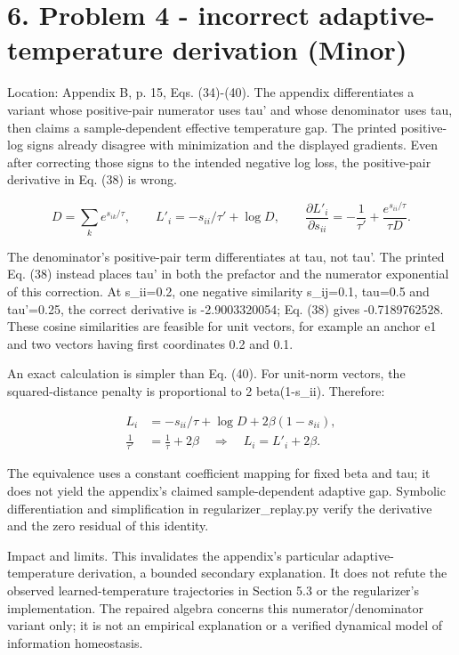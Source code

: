 \documentclass[10pt]{article}
\begin{document}
\section*{6. Problem 4 - incorrect adaptive-temperature derivation (Minor)}
Location: Appendix B, p. 15, Eqs. (34)-(40). The appendix differentiates a variant whose positive-pair numerator uses tau’ and whose denominator uses tau, then claims a sample-dependent effective temperature gap. The printed positive-log signs already disagree with minimization and the displayed gradients. Even after correcting those signs to the intended negative log loss, the positive-pair derivative in Eq. (38) is wrong.\par
\[D=\sum_k e^{s_{ik}/\tau},\qquad L'_i=-s_{ii}/\tau'+\log D,\qquad
\frac{\partial L'_i}{\partial s_{ii}}=-\frac1{\tau'}+\frac{e^{s_{ii}/\tau}}{\tau D}.\]\par
The denominator’s positive-pair term differentiates at tau, not tau’. The printed Eq. (38) instead places tau’ in both the prefactor and the numerator exponential of this correction. At s\_ii=0.2, one negative similarity s\_ij=0.1, tau=0.5 and tau’=0.25, the correct derivative is -2.9003320054; Eq. (38) gives -0.7189762528. These cosine similarities are feasible for unit vectors, for example an anchor e1 and two vectors having first coordinates 0.2 and 0.1.\par
An exact calculation is simpler than Eq. (40). For unit-norm vectors, the squared-distance penalty is proportional to 2 beta(1-s\_ii). Therefore:\par
\[\begin{aligned}
L_i&=-s_{ii}/\tau+\log D+2\beta(1-s_{ii}),\\
\frac1{\tau'}&=\frac1{\tau}+2\beta
\quad\Longrightarrow\quad L_i=L'_i+2\beta .
\end{aligned}\]\par
The equivalence uses a constant coefficient mapping for fixed beta and tau; it does not yield the appendix’s claimed sample-dependent adaptive gap. Symbolic differentiation and simplification in regularizer\_replay.py verify the derivative and the zero residual of this identity.\par
Impact and limits. This invalidates the appendix’s particular adaptive-temperature derivation, a bounded secondary explanation. It does not refute the observed learned-temperature trajectories in Section 5.3 or the regularizer’s implementation. The repaired algebra concerns this numerator/denominator variant only; it is not an empirical explanation or a verified dynamical model of information homeostasis.\par
\end{document}
